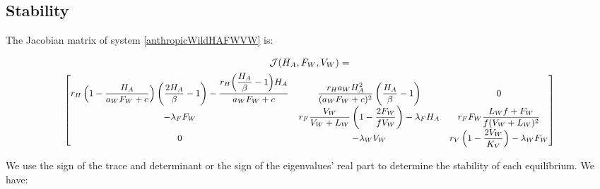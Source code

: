\documentclass{article}
\newcommand{\lfw}{\lambda_{F}}
\newcommand{\lfv}{\lambda_{W}}
\begin{document}
\subsection{Stability}

The Jacobian matrix of system \eqref{anthropicWildHAFWVW} is:

\begin{multline}
\mathcal{J}(H_A,F_W,V_W) = \\
{\small
\begin{bmatrix}
r_H \left(1-\dfrac{H_A}{a_W F_W +c} \right)\left(\dfrac{2H_A}{\beta}-1\right) - \dfrac{r_H \Big(\dfrac{H_A}{\beta}-1\Big)H_A}{a_WF_W + c} & \dfrac{r_H a_W H_A^2}{(a_WF_W + c)^2} \left(\dfrac{H_A}{\beta}-1\right) & 0\\
-\lfw F_W & r_F \dfrac{V_W}{V_W + L_W} \left(1 - \dfrac{2F_W}{fV_W}\right) -\lfw H_A  & r_F F_W \dfrac{L_W f + F_W}{f (V_W + L_W)^2} \\
0 & -\lfv V_W & r_V \left(1 - \dfrac{2V_W}{K_V}\right) - \lfv F_W
\end{bmatrix}}
\end{multline}

We use the sign of the trace and determinant or the sign of the eigenvalues' real part to determine the stability of each equilibrium. We have:
\end{document}

